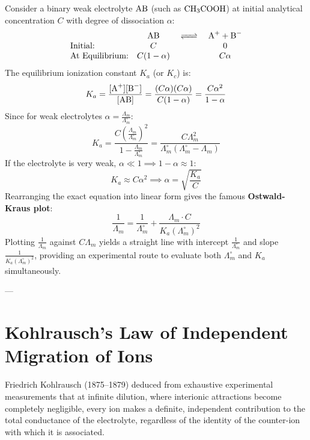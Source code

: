 Consider a binary weak electrolyte $\ce{AB}$ (such as $\ce{CH3COOH}$) at initial analytical concentration $C$ with degree of dissociation $\alpha$:
\begin{equation}
    \begin{array}{lccc}
        & \ce{AB} & \ce{<=>} & \ce{A+ + B-} \\
        \text{Initial:} & C & & 0 \\
        \text{At Equilibrium:} & C(1-\alpha) & & C\alpha
    \end{array}
\end{equation}
The equilibrium ionization constant $K_a$ (or $K_c$) is:
\begin{equation}
    K_a = \frac{[\ce{A+}][\ce{B-}]}{[\ce{AB}]} = \frac{(C\alpha)(C\alpha)}{C(1-\alpha)} = \frac{C\alpha^2}{1-\alpha}
\end{equation}
Since for weak electrolytes $\alpha = \frac{\Lambda_m}{\Lambda_m^\circ}$:
\begin{equation}
    K_a = \frac{C \left( \frac{\Lambda_m}{\Lambda_m^\circ} \right)^2}{1 - \frac{\Lambda_m}{\Lambda_m^\circ}} = \frac{C \Lambda_m^2}{\Lambda_m^\circ (\Lambda_m^\circ - \Lambda_m)}
\end{equation}
If the electrolyte is very weak, $\alpha \ll 1 \implies 1-\alpha \approx 1$:
\begin{equation}
    K_a \approx C\alpha^2 \implies \alpha = \sqrt{\frac{K_a}{C}}
\end{equation}
Rearranging the exact equation into linear form gives the famous \textbf{Ostwald-Kraus plot}:
\begin{equation}
    \boxed{\frac{1}{\Lambda_m} = \frac{1}{\Lambda_m^\circ} + \frac{\Lambda_m \cdot C}{K_a (\Lambda_m^\circ)^2}}
\end{equation}
Plotting $\frac{1}{\Lambda_m}$ against $C \Lambda_m$ yields a straight line with intercept $\frac{1}{\Lambda_m^\circ}$ and slope $\frac{1}{K_a (\Lambda_m^\circ)^2}$, providing an experimental route to evaluate both $\Lambda_m^\circ$ and $K_a$ simultaneously.

---

\section{Kohlrausch's Law of Independent Migration of Ions}

Friedrich Kohlrausch (1875--1879) deduced from exhaustive experimental measurements that at infinite dilution, where interionic attractions become completely negligible, every ion makes a definite, independent contribution to the total conductance of the electrolyte, regardless of the identity of the counter-ion with which it is associated.

